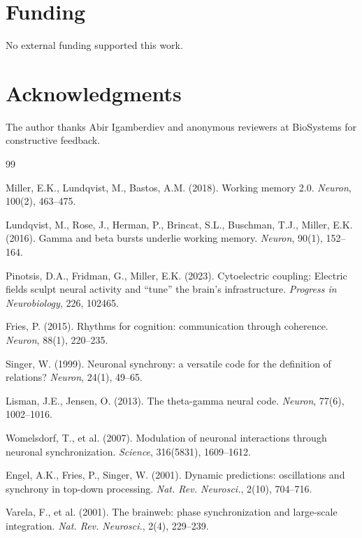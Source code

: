 \documentclass[12pt]{article}
\providecommand{\DIFaddend}{} %
\DeclareRobustCommand{\DIFaddend}{\DIFOaddend \let\includegraphics\DIFOincludegraphics} %
\begin{document}
\DIFaddend \section*{Funding}

No external funding supported this work.

\section*{Acknowledgments}

The author thanks Abir Igamberdiev and anonymous reviewers at BioSystems for constructive feedback.

\begin{thebibliography}{99}

Miller, E.K., Lundqvist, M., Bastos, A.M. (2018). Working memory 2.0. \textit{Neuron}, 100(2), 463--475.

Lundqvist, M., Rose, J., Herman, P., Brincat, S.L., Buschman, T.J., Miller, E.K. (2016). Gamma and beta bursts underlie working memory. \textit{Neuron}, 90(1), 152--164.

Pinotsis, D.A., Fridman, G., Miller, E.K. (2023). Cytoelectric coupling: Electric fields sculpt neural activity and ``tune'' the brain's infrastructure. \textit{Progress in Neurobiology}, 226, 102465.

Fries, P. (2015). Rhythms for cognition: communication through coherence. \textit{Neuron}, 88(1), 220--235.

Singer, W. (1999). Neuronal synchrony: a versatile code for the definition of relations? \textit{Neuron}, 24(1), 49--65.

Lisman, J.E., Jensen, O. (2013). The theta-gamma neural code. \textit{Neuron}, 77(6), 1002--1016.

Womelsdorf, T., et al. (2007). Modulation of neuronal interactions through neuronal synchronization. \textit{Science}, 316(5831), 1609--1612.

Engel, A.K., Fries, P., Singer, W. (2001). Dynamic predictions: oscillations and synchrony in top-down processing. \textit{Nat. Rev. Neurosci.}, 2(10), 704--716.

Varela, F., et al. (2001). The brainweb: phase synchronization and large-scale integration. \textit{Nat. Rev. Neurosci.}, 2(4), 229--239.


\end{thebibliography}
\end{document}
